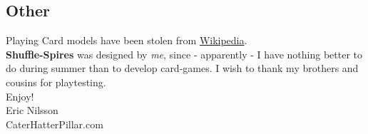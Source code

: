 \documentclass[11pt,twocolumn]{article}
\begin{document}
\subsection{Other}

\noindent
Playing Card models have been stolen from \href{''http://en.wikipedia.org/wiki/Playing_card#French_design''}{Wikipedia}. \\

\noindent
\textbf{Shuffle-Spires} was designed by \textit{me}, since - apparently - I have nothing better to do during summer than to develop card-games. I wish to thank my brothers and cousins for playtesting. \\
Enjoy! \\

\noindent
Eric Nilsson \\
CaterHatterPillar.com
\end{document}
